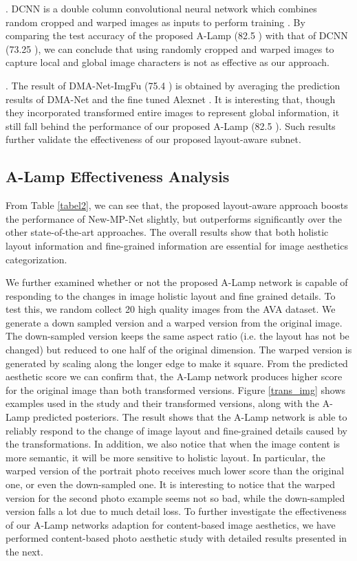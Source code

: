 \documentclass[10pt,twocolumn,letterpaper]{article}
\begin{document}
	. DCNN \cite{Lu:2014:TMM:rating} is a double column convolutional neural network which combines random cropped and warped images as inputs to perform training . By comparing the test accuracy of the proposed A-Lamp (82.5 ) with that of DCNN (73.25 ), we can conclude that using randomly cropped and warped images to capture local and global image characters is not as effective as our approach.
	
	. The result of DMA-Net-ImgFu (75.4 ) \cite{Lu:2015:ICCV} is obtained by averaging the prediction results of DMA-Net and the fine tuned Alexnet \cite{Alex:2012:NIPS:ImageNet}. It is interesting that, though they incorporated transformed entire images to represent global information, it still fall behind the performance of our proposed A-Lamp (82.5 ). Such results further validate the effectiveness of our proposed layout-aware subnet. 
	
	
	\subsection{A-Lamp Effectiveness Analysis}
	From Table \ref{tabel2}, we can see that, the proposed layout-aware approach boosts the performance of New-MP-Net slightly, but outperforms significantly over the other state-of-the-art approaches. The overall results show that both holistic layout information and fine-grained information are essential for image aesthetics categorization. 


	We further examined whether or not the proposed A-Lamp network is capable of responding to the changes in image holistic layout and fine grained details. To test this, we random collect 20 high quality images from the AVA dataset. We generate a down sampled version and a warped version from the original image. The down-sampled version keeps the same aspect ratio (i.e. the layout has not be changed) but reduced to one half of the original dimension. The warped version is generated by scaling along the longer edge to make it square. From the predicted aesthetic score we can confirm that, the A-Lamp network produces higher score for the original image than both transformed versions. Figure \ref{trans_img} shows examples used in the study and their transformed versions, along with the A-Lamp predicted posteriors. The result shows that the A-Lamp network is able to reliably respond to the change of image layout and fine-grained details caused by the transformations. 
	In addition, we also notice that when the image content is more semantic, it will be more sensitive to holistic layout. In particular, the warped version of the portrait photo receives much lower score than the original one, or even the down-sampled one. It is interesting to notice that the warped version for the second photo example seems not so bad, while the down-sampled version falls a lot due to much detail loss. To further investigate the effectiveness of our A-Lamp networks adaption for content-based image aesthetics, we have performed content-based photo aesthetic study with detailed results presented in the next.
	
\end{document}
